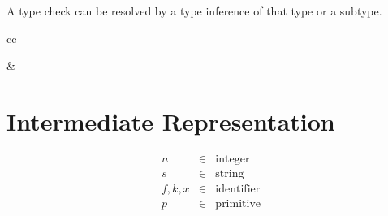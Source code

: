 \documentclass[11pt]{article}
\newcommand{\kw}[1]{\mathtt{#1}}
\begin{document}
A type check can be resolved by a type inference of that type or a subtype.

\begin{rules}{cc}


&


\end{rules}

\newpage

\section{Intermediate Representation}

\newcommand{\appc}[2]{#1\;#2}
\newcommand{\appf}[3]{#1\;#2\;#3}
\newcommand{\letc}[4]{\kw{letc}\;#1\;#2 = #3\;\kw{in}\;#4}

\newcommand{\defterm}[4]{#1\;#2\;#3 = #4}
\newcommand{\letf}[2]{\kw{letf}\;\repo{#1}\;\kw{in}\;#2}
\newcommand{\letff}[2]{\kw{letf}\;#1\;\kw{in}\;#2}

\newcommand{\letv}[3]{\kw{letv}\;#1 = #2\;\kw{in}\;#3}

\newcommand{\funv}[3]{\kw{fun}\;#1\;#2\;.\;#3}
\newcommand{\intv}[1]{#1}
\newcommand{\prmv}[2]{#1(#2)}
\newcommand{\rowv}[2]{\{ \repo{#1 = #2} \}}
\newcommand{\rowvs}[2]{\{ #1 \}}
\newcommand{\strv}[1]{#1}

\newcommand{\andv}[2]{\kw{concat}\;#1\;#2}
\newcommand{\argv}[1]{\kw{argument}\;#1}
\newcommand{\capv}[2]{\kw{capability}\;#1\;#2}
\newcommand{\selv}[2]{\kw{select}\;#1\;#2}

\[
\begin{array}{lcl}
n & \in & \text{integer} \\
s & \in & \text{string} \\
f, k, x & \in & \text{identifier} \\
p & \in & \text{primitive} \\
\end{array}
\]
\end{document}
